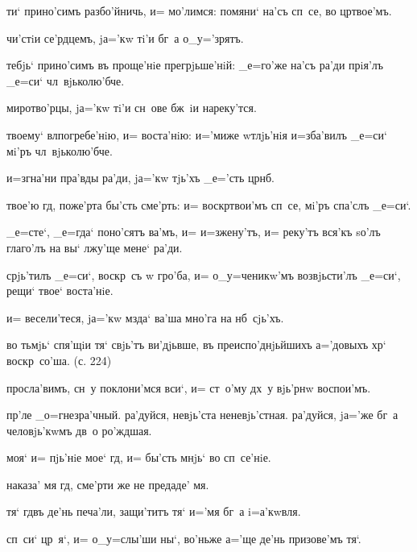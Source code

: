 
 ти` прино'симъ разбо'йничь, и= мо'лимся: 
помяни` на'съ сп~се, во цр твое'мъ.

  чи'стiи се'рдцемъ, jа='кw тi'и 
бг~а о_у='зрятъ.

 тебjь` прино'симъ въ проще'нiе 
прегрjьше'нiй: _е=го'же на'съ ра'ди прiя'лъ _е=си` 
чл~вjьколю'бче.

  миротво'рцы, jа='кw тi'и сн~ове 
бж~iи нареку'тся.

 твоему` вл погребе'нiю, и= 
воста'нiю: и='миже w\т тлjь'нiя и=зба'вилъ _е=си` мi'ръ 
чл~вjьколю'бче.

  и=згна'ни пра'вды ра'ди, jа='кw 
тjь'хъ _е='сть цр нб.

 твое'ю гд, поже'рта бы'сть сме'рть: и= 
воскр твои'мъ сп~се, мi'ръ спа'слъ _е=си`.

  _е=сте`, _е=гда` поно'сятъ ва'мъ, 
и= и=зжену'тъ, и= реку'тъ вся'къ sо'лъ глаго'лъ на вы` 
лжу'ще мене` ра'ди.

 срjь'тилъ _е=си`, воскр~съ w\т 
гро'ба, и= о_у=ченикw'мъ возвjьсти'лъ _е=си`, рещи` твое` 
воста'нiе.

  и= весели'теся, jа='кw мзда` 
ва'ша мно'га на нб~сjь'хъ.

 во тьмjь` спя'щiи тя` свjь'тъ ви'дjьвше, въ 
преиспо'днjьйшихъ а='довыхъ хр` воскр~со'ша. (с. 224)

  просла'вимъ, сн~у поклони'мся 
вси`, и= ст~о'му дх~у вjь'рнw воспои'мъ.

    пр'ле 
_о=гнезра'чный. ра'дуйся, невjь'ста неневjь'стная. 
ра'дуйся, jа='же бг~а человjь'кwмъ дв~о ро'ждшая.

    моя` и= пjь'нiе 
мое` гд, и= бы'сть мнjь` во сп~се'нiе.

  наказа' мя гд, сме'рти же не 
предаде' мя.

  тя` гд въ де'нь 
печа'ли, защи'титъ тя` и='мя бг~а i=а'кwвля.

  сп~си` цр~я`, и= о_у=слы'ши ны`, 
во'ньже а='ще де'нь призове'мъ тя`.

